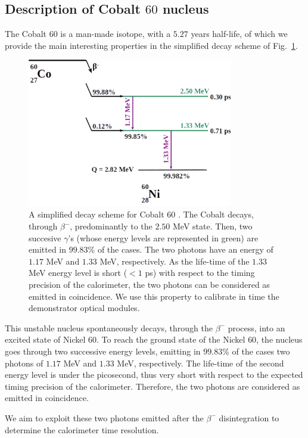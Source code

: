 \subsection{Description of Cobalt $60$ nucleus}
\label{subsec:CoSource}
The Cobalt $60$ is a man-made isotope, with a $5.27$ years half-life, of which we provide the main interesting properties in the simplified decay scheme of Fig.~\ref{fig:Co_decay_scheme}.
\begin{figure}[h]
  \centering
  \includegraphics[width=9cm]{commissioning/fig_commissioning/Co_decay_scheme.pdf}
  \caption{A simplified decay scheme for Cobalt $60$ \cite{web:nucleide}.
    The Cobalt decays, through $\beta^{-}$, predominantly to the $2.50$ MeV state.
    Then, two succesive $\gamma$'s (whose energy levels are represented in green) are emitted in $99.83$\% of the cases.
    The two photons have an energy of $1.17$ MeV and $1.33$ MeV, respectively.
    As the life-time of the $1.33$ MeV energy level is short ($<1$ ps) with respect to the timing precision of the calorimeter, the two photons can be considered as emitted in coincidence.
    We use this property to calibrate in time the demonstrator optical modules.
    \label{fig:Co_decay_scheme}}
\end{figure}
This unstable nucleus spontaneously decays, through the $\beta^{-}$ process, into an excited state of Nickel $60$.
To reach the ground state of the Nickel $60$, the nucleus goes through two successive energy levels, emitting in $99.83$\% of the cases two photons of $1.17$ MeV and $1.33$ MeV, respectively.
The life-time of the second energy level is under the picosecond, thus very short with respect to the expected timing precision of the calorimeter.
Therefore, the two photons are considered as emitted in coincidence.

We aim to exploit these two photons emitted after the $\beta^{-}$ disintegration to determine the calorimeter time resolution.

